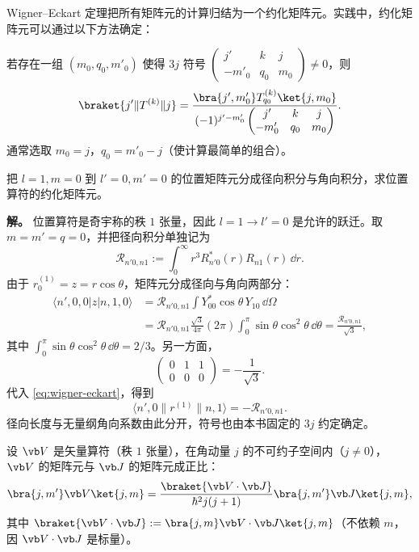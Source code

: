 Wigner--Eckart 定理把所有矩阵元的计算归结为一个约化矩阵元。实践中，约化矩阵元可以通过以下方法确定：
\begin{proposition}[约化矩阵元的确定方法]
若存在一组 $(m_0,q_0,m'_0)$ 使得 $3j$ 符号 $\begin{pmatrix}j'&k&j\\-m'_0&q_0&m_0\end{pmatrix}\ne0$，则
\begin{equation}
\braket{j'\|T^{(k)}\|j}
=\frac{\bra{j',m'_0}T^{(k)}_{q_0}\ket{j,m_0}}{(-1)^{j'-m'_0}\begin{pmatrix}j'&k&j\\-m'_0&q_0&m_0\end{pmatrix}}.
\label{eq:reduced-me-formula}
\end{equation}
通常选取 $m_0=j$，$q_0=m'_0-j$（使计算最简单的组合）。
\end{proposition}
\medskip
\begin{example}[位置算符的约化矩阵元]
把 $l=1,m=0$ 到 $l\prime=0,m\prime=0$ 的位置矩阵元分成径向积分与角向积分，求位置算符的约化矩阵元。

\textbf{解。} 位置算符是奇宇称的秩 $1$ 张量，因此 $l=1\to l'=0$ 是允许的跃迁。取 $m=m'=q=0$，并把径向积分单独记为
\[
\mathcal R_{n'0,n1}:=\int_0^\infty r^3R_{n'0}^*(r)R_{n1}(r)\,\dd r.
\]
由于 $r^{(1)}_0=z=r\cos\theta$，矩阵元分成径向与角向两部分：
\begin{align*}
\langle n',0,0|z|n,1,0\rangle
&=\mathcal R_{n'0,n1}\int Y_{00}^*\cos\theta\,Y_{10}\,\dd\Omega\\
&=\mathcal R_{n'0,n1}\frac{\sqrt3}{4\pi}(2\pi)\int_0^\pi\sin\theta\cos^2\theta\,\dd\theta
=\frac{\mathcal R_{n'0,n1}}{\sqrt3},
\end{align*}
其中 $\int_0^\pi\sin\theta\cos^2\theta\,\dd\theta=2/3$。另一方面，
\[
\begin{pmatrix}0&1&1\\0&0&0\end{pmatrix}=-\frac1{\sqrt3}.
\]
代入 \cref{eq:wigner-eckart}，得到
\[
\langle n',0\|r^{(1)}\|n,1\rangle=-\mathcal R_{n'0,n1}.
\]
径向长度与无量纲角向系数由此分开，符号也由本书固定的 $3j$ 约定确定。
\end{example}
\par\medskip
\begin{theorem}
\label{thm:projection}
设 $\vb V$ 是矢量算符（秩 $1$ 张量），在角动量 $j$ 的不可约子空间内（$j\ne0$），$\vb V$ 的矩阵元与 $\vb J$ 的矩阵元成正比：
\begin{equation}
\bra{j,m'}\vb V\ket{j,m}
=\frac{\braket{\vb V\cdot\vb J}}{\hbar^2 j(j+1)}\bra{j,m'}\vb J\ket{j,m},
\label{eq:projection-theorem}
\end{equation}
其中 $\braket{\vb V\cdot\vb J}:=\bra{j,m}\vb V\cdot\vb J\ket{j,m}$（不依赖 $m$，因 $\vb V\cdot\vb J$ 是标量）。
\end{theorem}
